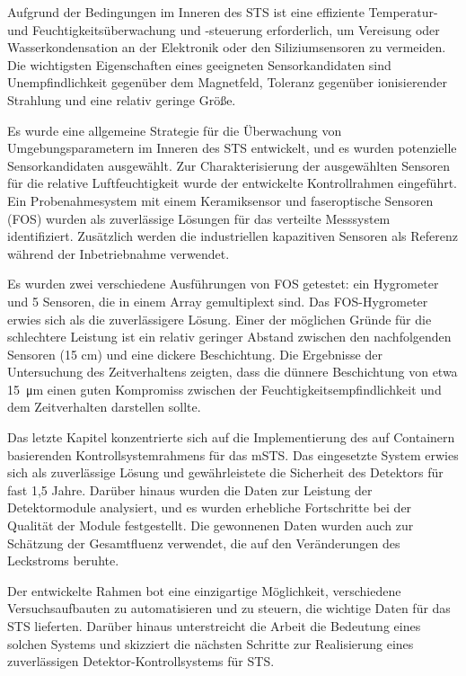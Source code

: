 Aufgrund der Bedingungen im Inneren des \gls{STS} ist eine effiziente Temperatur- und Feuchtigkeitsüberwachung und -steuerung erforderlich, um Vereisung oder Wasserkondensation an der Elektronik oder den Siliziumsensoren zu vermeiden. Die wichtigsten Eigenschaften eines geeigneten Sensorkandidaten sind Unempfindlichkeit gegenüber dem Magnetfeld, Toleranz gegenüber ionisierender Strahlung und eine relativ geringe Größe.

Es wurde eine allgemeine Strategie für die Überwachung von Umgebungsparametern im Inneren des \gls{STS} entwickelt, und es wurden potenzielle Sensorkandidaten ausgewählt. Zur Charakterisierung der ausgewählten Sensoren für die relative Luftfeuchtigkeit wurde der entwickelte Kontrollrahmen eingeführt. Ein Probenahmesystem mit einem Keramiksensor und faseroptische Sensoren (\gls{FOS}) wurden als zuverlässige Lösungen für das verteilte Messsystem identifiziert. Zusätzlich werden die industriellen kapazitiven Sensoren als Referenz während der Inbetriebnahme verwendet.

Es wurden zwei verschiedene Ausführungen von \gls{FOS} getestet: ein Hygrometer und 5 Sensoren, die in einem Array gemultiplext sind. Das \gls{FOS}-Hygrometer erwies sich als die zuverlässigere Lösung. Einer der möglichen Gründe für die schlechtere Leistung ist ein relativ geringer Abstand zwischen den nachfolgenden Sensoren (15 cm) und eine dickere Beschichtung. Die Ergebnisse der Untersuchung des Zeitverhaltens zeigten, dass die dünnere Beschichtung von etwa \SI{15}{\micro\metre} einen guten Kompromiss zwischen der Feuchtigkeitsempfindlichkeit und dem Zeitverhalten darstellen sollte. 

Das letzte Kapitel konzentrierte sich auf die Implementierung des auf Containern basierenden Kontrollsystemrahmens für das \gls{mSTS}. Das eingesetzte System erwies sich als zuverlässige Lösung und gewährleistete die Sicherheit des Detektors für fast 1,5 Jahre. Darüber hinaus wurden die Daten zur Leistung der Detektormodule analysiert, und es wurden erhebliche Fortschritte bei der Qualität der Module festgestellt. Die gewonnenen Daten wurden auch zur Schätzung der Gesamtfluenz verwendet, die auf den Veränderungen des Leckstroms beruhte. 

Der entwickelte Rahmen bot eine einzigartige Möglichkeit, verschiedene Versuchsaufbauten zu automatisieren und zu steuern, die wichtige Daten für das \gls{STS} lieferten. Darüber hinaus unterstreicht die Arbeit die Bedeutung eines solchen Systems und skizziert die nächsten Schritte zur Realisierung eines zuverlässigen Detektor-Kontrollsystems für \gls{STS}.